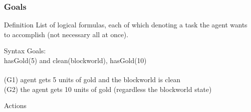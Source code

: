 \documentclass{beamer}
\newcommand\tab[1][1cm]{\hspace*{#1}}
\begin{document}
\begin{frame}
\frametitle{Goals}
\begin{block}{Definition}
	List of logical formulas, each of which denoting a task the agent wants to accomplish (not necessary all at once).
\end{block}
\begin{block}{Syntax}
  Goals: \\
  \tab  hasGold(5) and clean(blockworld), hasGold(10) \\~\\
  (G1) agent gets 5 units of gold and the blockworld is clean \\ 
  (G2) the agent gets 10 units of gold (regardless the blockworld state)
\end{block}
\end{frame}

\begin{frame}
\Huge{\centerline{Actions}}
\end{frame}
\end{document}
